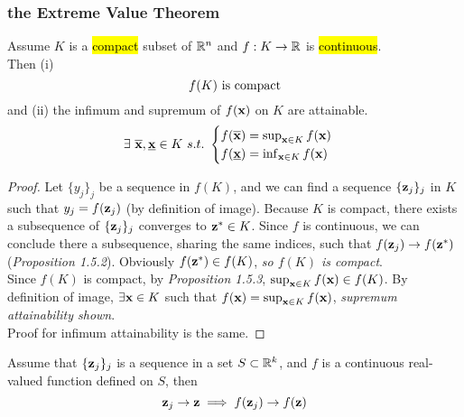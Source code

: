\documentclass[11pt]{article}
\newcommand{\vex}[0]{\ve{x}}
\begin{document}
			\subsubsection{the Extreme Value Theorem}
				\begin{theorem}
					Assume $K$ is a \hl{compact} subset of $\mathbb{R}^n$ and $f: K \to \mathbb{R}$ is \hl{continuous}. \\
					Then (i) 
					\begin{equation}
						f(K) \text{{ is compact}}
					\end{equation}
					and (ii) the infimum and supremum of $f(\vex)$ on $K$ are attainable.
					\begin{equation}
						\exists\ \overline{\vex}, \underbar{\vex} \in K\ s.t.\ 
						\begin{cases}
							f(\overline{\vex}) = \sup_{\vex \in K} f(\vex)\\
							f(\underbar{\vex}) = \inf_{\vex \in K} f(\vex)
						\end{cases}
					\end{equation}
					\begin{proof}
						Let $\{y_j\}_j$ be a sequence in $f(K)$, and we can find a sequence $\{\textbf{z}_j\}_j$ in $K$ such that $y_j = f(\textbf{z}_j)$ (by definition of image). Because $K$ is compact, there exists a subsequence of $\{\textbf{z}_j\}_j$ converges to $\textbf{z}^* \in K$. Since $f$ is continuous, we can conclude there a subsequence, sharing the same indices, such that $f(\textbf{z}_j) \to f(\textbf{z}^*)$ (\emph{Proposition 1.5.2}). Obviously $f(\textbf{z}^*) \in f(K)$, \emph{so $f(K)$ is compact}. \\
						Since $f(K)$ is compact, by \emph{Proposition 1.5.3}, $\sup_{\vex \in K} f(\vex) \in f(K)$. By definition of image, $\exists \vex \in K$ such that $f(\vex) = \sup_{\vex \in K} f(\vex)$, \emph{supremum attainability shown}.\\
						Proof for infimum attainability is the same.
					\end{proof}
				\end{theorem}
				
				\begin{proposition}
					Assume that $\{\textbf{z}_j\}_j$ is a sequence in a set $S \subset \mathbb{R}^k$, and $f$ is a continuous real-valued function defined on $S$, then
					\begin{equation}
						\textbf{z}_j \to \textbf{z} \implies f(\textbf{z}_j) \to f(\textbf{z})
					\end{equation}
				\end{proposition}
				
\end{document}
